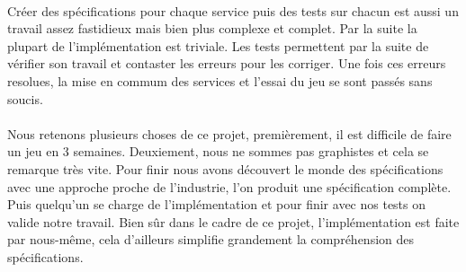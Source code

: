 \documentclass[a4paper,titlepage,openany,12pt]{report}
\begin{document}
\paragraph{}
Créer des spécifications pour chaque service puis des tests sur
chacun est aussi un travail assez fastidieux mais bien plus complexe
et complet. Par la suite la plupart de l'implémentation est triviale.
Les tests permettent par la suite de vérifier son travail et contaster
les erreurs pour les corriger.
Une fois ces erreurs resolues, la mise en commum des services et l'essai
du jeu se sont passés sans soucis.

\paragraph{}
Nous retenons plusieurs choses de ce projet, premièrement, il est
difficile de faire un jeu en 3 semaines.
Deuxiement, nous ne sommes pas graphistes et cela se remarque très
vite.
Pour finir nous avons découvert le monde des spécifications avec une
approche proche de l'industrie, l'on produit une spécification
complète. Puis quelqu'un se charge de l'implémentation et pour finir
avec nos tests on valide notre travail.
Bien sûr dans le cadre de ce projet, l'implémentation est faite par
nous-même, cela d'ailleurs simplifie grandement la compréhension des
spécifications.
\end{document}
